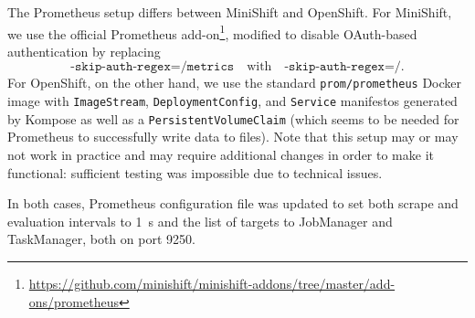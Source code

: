 \documentclass{article}
\begin{document}
The Prometheus setup differs between MiniShift and OpenShift. For MiniShift, we
use the official Prometheus
add-on\footnote{\url{https://github.com/minishift/minishift-addons/tree/master/add-ons/prometheus}},
modified to disable OAuth-based authentication by replacing
\[
  \texttt{-skip-auth-regex=\^{}/metrics} \quad \text{with} \quad
  \texttt{-skip-auth-regex=\^{}/}.
\]
For OpenShift, on the other hand, we use the standard \texttt{prom/prometheus}
Docker image with \texttt{ImageStream}, \texttt{DeploymentConfig}, and
\texttt{Service} manifestos generated by Kompose as well as a
\texttt{PersistentVolumeClaim} (which seems to be needed for Prometheus to
successfully write data to files). Note that this setup may or may not work in
practice and may require additional changes in order to make it functional:
sufficient testing was impossible due to technical issues.

In both cases, Prometheus configuration file was updated to set both scrape and
evaluation intervals to \SI{1}{\second} and the list of targets to JobManager
and TaskManager, both on port 9250.
\end{document}
